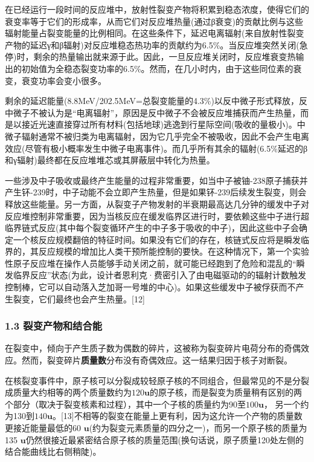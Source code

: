在已经运行一段时间的反应堆中，放射性裂变产物将积累到稳态浓度，使得它们的衰变率等于它们的形成率，从而它们对反应堆热量(通过β衰变)的贡献比例与这些辐射能量占裂变能量的比例相同。在这些条件下，延迟电离辐射(来自放射性裂变产物的延迟γ和β辐射)对反应堆稳态热功率的贡献约为6.5\%。当反应堆突然关闭(急停)时，剩余的热量输出就来源于此。因此，一旦反应堆关闭时，反应堆衰变热输出的初始值为全稳态裂变功率的6.5\%。然而，在几小时内，由于这些同位素的衰变，衰变功率会变小很多。

剩余的延迟能量(8.8MeV/202.5MeV=总裂变能量的4.3\%)以反中微子形式释放，反中微子不被认为是“电离辐射”，原因是反中微子不会被反应堆捕获而产生热量，而是以接近光速直接穿过所有材料(包括地球)逃逸到行星际空间(吸收的量极小)。中微子辐射通常不被归类为电离辐射，因为它几乎完全不被吸收，因此不会产生电离效应(尽管有极小概率发生中微子电离事件)。而几乎所有其余的辐射(6.5\%延迟的β和γ辐射)最终都在反应堆堆芯或其屏蔽层中转化为热量。

一些涉及中子吸收或最终产生能量的过程非常重要，如当中子被铀-238原子捕获并产生钚-239时，中子动能不会立即产生热量，但是如果钚-239后续发生裂变，则会释放这些能量。另一方面，从裂变子产物发射的半衰期最高达几分钟的缓发中子对反应堆控制非常重要，因为当核反应在缓发临界区进行时，要依赖这些中子进行超临界链式反应(其中每个裂变循环产生的中子多于吸收的中子)，因此这些中子会确定一个核反应规模翻倍的特征时间。如果没有它们的存在，核链式反应将是瞬发临界的，其反应规模的增加比人类干预所能控制的要快。在这种情况下，第一个实验性原子反应堆在操作人员能够手动关闭之前，就可能已经跑到了危险和混乱的“瞬发临界反应”状态(为此，设计者恩利克·费密引入了由电磁驱动的的辐射计数触发控制棒，它可以自动落入芝加哥一号堆的中心)。如果这些缓发中子被俘获而不产生裂变，它们最终也会产生热量。[12]

\subsubsection{1.3 裂变产物和结合能}
在裂变中，倾向于产生质子数为偶数的碎片，这被称为裂变碎片电荷分布的奇偶效应。然而，裂变碎片\textbf{质量数}分布没有奇偶效应。这一结果归因于核子对断裂。

在核裂变事件中，原子核可以分裂成较轻原子核的不同组合，但最常见的不是分裂成质量大约相等的两个质量数约为$120\mathbf{u}$的原子核，而是裂变为质量稍有区别的两个部分（取决于裂变核素和过程），其中一个子核的质量约为90至$100\mathbf{u}$， 另一个约为130到$140\mathbf{u}$。[13]不相等的裂变在能量上更有利，因为这允许一个产物的质量数更接近能量最低的60 $\mathbf{u}$(约为裂变元素质量的四分之一)，而另一个原子核的质量为135 $\mathbf{u}$仍然很接近最紧密结合原子核的质量范围(换句话说，原子质量120处左侧的结合能曲线比右侧稍陡)。

